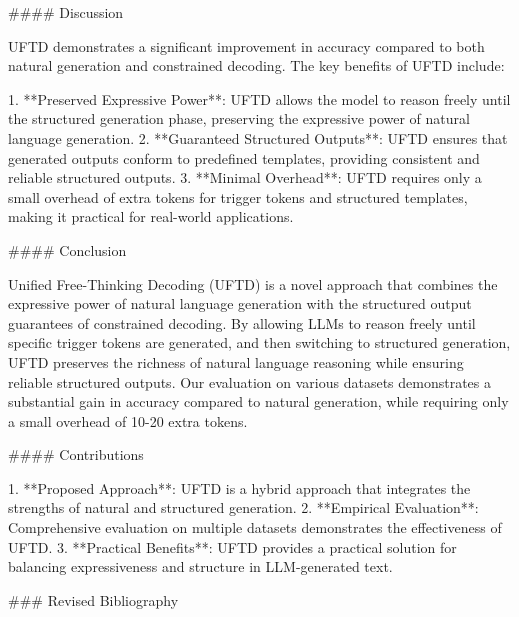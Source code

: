 #### Discussion

UFTD demonstrates a significant improvement in accuracy compared to both natural generation and constrained decoding. The key benefits of UFTD include:

1. **Preserved Expressive Power**: UFTD allows the model to reason freely until the structured generation phase, preserving the expressive power of natural language generation.
2. **Guaranteed Structured Outputs**: UFTD ensures that generated outputs conform to predefined templates, providing consistent and reliable structured outputs.
3. **Minimal Overhead**: UFTD requires only a small overhead of extra tokens for trigger tokens and structured templates, making it practical for real-world applications.

#### Conclusion

Unified Free-Thinking Decoding (UFTD) is a novel approach that combines the expressive power of natural language generation with the structured output guarantees of constrained decoding. By allowing LLMs to reason freely until specific trigger tokens are generated, and then switching to structured generation, UFTD preserves the richness of natural language reasoning while ensuring reliable structured outputs. Our evaluation on various datasets demonstrates a substantial gain in accuracy compared to natural generation, while requiring only a small overhead of 10-20 extra tokens. 

#### Contributions

1. **Proposed Approach**: UFTD is a hybrid approach that integrates the strengths of natural and structured generation.
2. **Empirical Evaluation**: Comprehensive evaluation on multiple datasets demonstrates the effectiveness of UFTD.
3. **Practical Benefits**: UFTD provides a practical solution for balancing expressiveness and structure in LLM-generated text.

### Revised Bibliography

